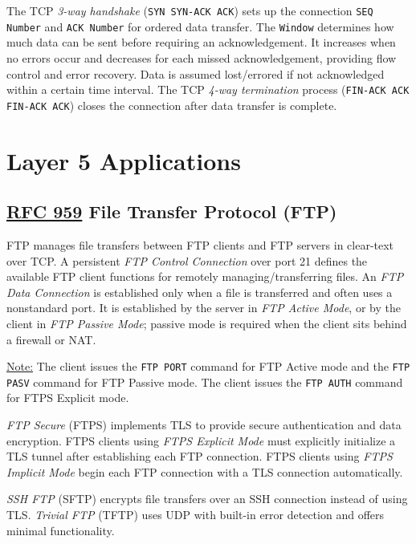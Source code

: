 \documentclass[12pt]{article}
\newif\ifcolor											%
\newcommand{\note}[1]{\ifcolor \colorbox{#1}{Note:}\else \underline{Note:}\fi}
\newcommand{\RFC}[1]{\href{https://datatracker.ietf.org/doc/html/rfc#1}{RFC #1}}
\begin{document}
	The TCP \textit{3-way handshake} (\texttt{SYN SYN-ACK ACK}) sets up the connection \texttt{SEQ Number} and \texttt{ACK Number} for ordered data transfer. The \texttt{Window} determines how much data can be sent before requiring an acknowledgement. It increases when no errors occur and decreases for each missed acknowledgement, providing flow control and error recovery. Data is assumed lost/errored if not acknowledged within a certain time interval. The TCP \textit{4-way termination} process (\texttt{FIN-ACK ACK FIN-ACK ACK}) closes the connection after data transfer is complete.





\section{Layer 5 Applications \label{sec:L5}}

	\subsection[RFC 959 FTP]{\RFC{959} File Transfer Protocol (FTP) \label{subsec:FTP}}
	FTP manages file transfers between FTP clients and FTP servers in clear-text over TCP. A persistent \textit{FTP Control Connection} over port 21 defines the available FTP client functions for remotely managing/transferring files. An \textit{FTP Data Connection} is established only when a file is transferred and often uses a nonstandard port. It is established by the server in \textit{FTP Active Mode}, or by the client in \textit{FTP Passive Mode}; passive mode is required when the client sits behind a firewall or NAT.

	\note{Goldenrod} The client issues the \texttt{FTP PORT} command for FTP Active mode and the \texttt{FTP PASV} command for FTP Passive mode. The client issues the \texttt{FTP AUTH} command for FTPS Explicit mode.

	\textit{FTP Secure} (FTPS) implements TLS to provide secure authentication and data encryption. FTPS clients using \textit{FTPS Explicit Mode} must explicitly initialize a TLS tunnel after establishing each FTP connection. FTPS clients using \textit{FTPS Implicit Mode} begin each FTP connection with a TLS connection automatically.

	\textit{SSH FTP} (SFTP) encrypts file transfers over an SSH connection instead of using TLS. \textit{Trivial FTP} (TFTP) uses UDP with built-in error detection and offers minimal functionality.
\end{document}
